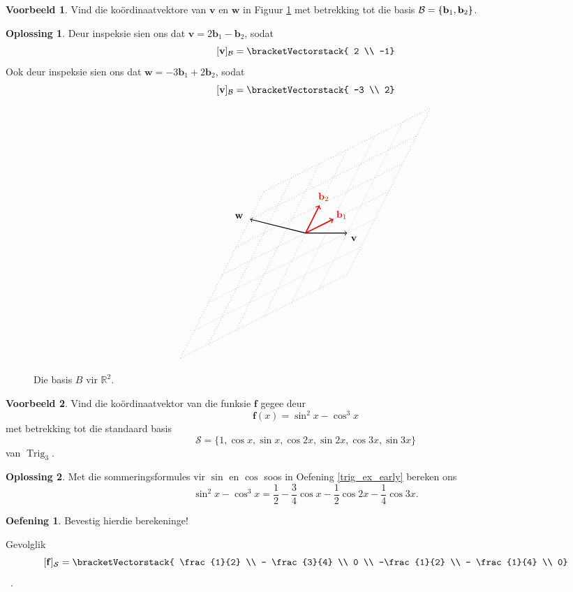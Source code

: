 \documentclass[a4paper,11pt]{book}
\theoremstyle{definition}
\newtheorem{exercise}{Oefening}
\newtheorem{example_environment}{Voorbeeld}[chapter]
\newtheorem*{solution}{Oplossing}
\newcommand{\ve}[1]{\mathbf{#1}}
\newcommand{\basis}[1]{{\mathcal #1}}
\newcommand{\cvector}[1]{\bracketVectorstack{#1}}
\newenvironment{example}
	{
		\begin{oframed}
		\begin{example_environment}
	}
	{
		\end{example_environment}
		\end{oframed}
	}
\newcommand{\bmark}{\raisebox{.53ex}{\rule{.2em}{.1ex}}}
\newcommand{\bopen}{{\protect\ooalign{\{\cr\hfil\bmark\hfil\cr}}}
\newcommand{\bclose}{{\protect\ooalign{\}\cr\hfil\bmark\hfil\cr}}}
\DeclareMathOperator{\Trig}{Trig}
\begin{document}
\begin{example} Vind die ko{\"o}rdinaatvektore van $\ve{v}$ en $\ve{w}$ in
	Figuur \ref{v_and_w_in_basis_B} met betrekking tot die basis $\basis{B}
	= \bopen \ve{b}_1, \ve{b}_2 \bclose$.

	\begin{solution} Deur inspeksie sien ons dat $\ve{v} = 2 \ve{b}_1 -
		\ve{b}_2$, sodat
		\[
			[\ve{v}]_\basis{B} = \cvector{ 2 \\ -1}
		\]
		Ook deur inspeksie sien ons dat $\ve{w} = -3 \ve{b}_1 + 2
		\ve{b}_2$, sodat
		\[
			[\ve{v}]_\basis{B} = \cvector{ -3 \\ 2}
		\]
	\end{solution}
\end{example}

\begin{figure}
	\[
		\begin{tikzpicture}[scale=0.5]
			\draw[red, dotted] (-9, -9) -- (3, -3);
			\draw[red, dotted] (-8, -7) -- (4, -1);
			\draw[red, dotted] (-7, -5) -- (5, 1);
			\draw[red, dotted] (-6, -3) -- (6, 3);
			\draw[red, dotted] (-5, -1) -- (7, 5);
			\draw[red, dotted] (-4, 1) -- (8, 7);
			\draw[red, dotted] (-3, 3) -- (9, 9);

			\draw[red, dotted] (-9, -9) -- (-3, 3);
			\draw[red, dotted] (-7, -8) -- (-1, 4);
			\draw[red, dotted] (-5, -7) -- (1, 5);
			\draw[red, dotted] (-3, -6) -- (3, 6);
			\draw[red, dotted] (-1, -5) -- (5, 7);
			\draw[red, dotted] (1, -4) -- (7, 8);
			\draw[red, dotted] (3, -3) -- (9, 9);


			\draw[very thick, red, ->] (0,0) -- node[pos=1.3] {$\ve{b}_1$}
			(2,1);
			\draw[very thick, red, ->] (0,0) -- node[pos=1.3] {$\ve{b}_2$}
			(1,2);
			\draw[thick, ->] (0,0) -- (3,0) node[below right] {$\ve{v}$};
			\draw[thick, ->] (0,0) -- node[pos=1.2] {$\ve{w}$} (-4,1); 
		\end{tikzpicture}
	\]
	\caption{\label{v_and_w_in_basis_B}
	Die basis $B$ vir $\mathbb{R}^2$.}
\end{figure}

\begin{example} Vind die ko{\"o}rdinaatvektor van die funksie $\ve{f}$
	gegee deur
	\[
		\ve{f}(x) = \sin^2 x - \cos^3 x
	\]
	met betrekking tot die standaard basis
	\[
		\basis{S} = \{1, \cos x, \sin x, \cos 2x, \sin 2x, \cos 3x, \sin
		3x\}
	\]
	van $\Trig_3$.
	\begin{solution} Met die sommeringsformules vir $\sin$ en $\cos$ soos
		in Oefening \ref{trig_ex_early} bereken ons
		\[ 
			\sin^2 x - \cos^3 x = \frac{1}{2} - \frac{3}{4} \cos x -
			\frac{1}{2} \cos 2x - \frac{1}{4} \cos 3x.
		\]
		\begin{exercise} Bevestig hierdie berekeninge!
		\end{exercise}
		Gevolglik
		\[
			[\ve{f}]_\basis{S} = \cvector{ \frac{1}{2} \\ - \frac{3}{4} \\
			0 \\ -\frac{1}{2} \\ - \frac{1}{4} \\ 0}
		\] \, .
	\end{solution}
\end{example}
\end{document}
